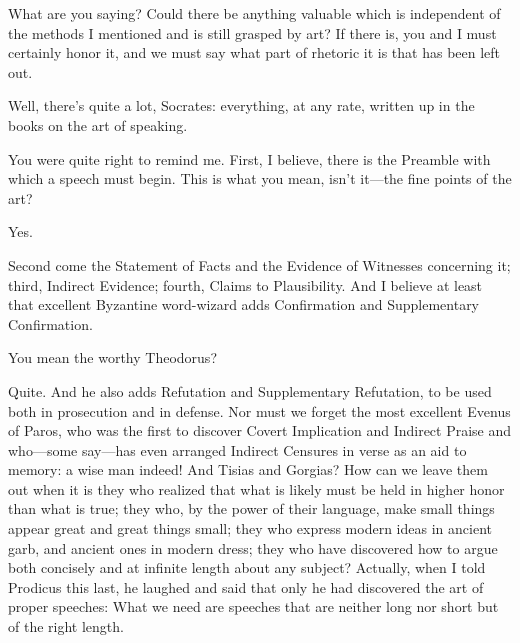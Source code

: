 \saysocrates What are you saying? Could there be anything valuable which 
is independent of the methods I mentioned and is still grasped
by art? If there is, you and I must certainly honor it, and we must say
what part of rhetoric it is that has been left out.

\sayphaedrus Well, there’s quite a lot, Socrates: everything, at any rate,
written up in the books on the art of speaking.

\saysocrates You were quite right to remind me. First, I believe, there is
the Preamble with which a speech must begin. This is what you mean,
isn’t it---the fine points of the art?

\sayphaedrus Yes.

\saysocrates Second come the Statement of Facts and the Evidence of
Witnesses concerning it; third, Indirect Evidence; fourth, Claims to
Plausibility. And I believe at least that excellent Byzantine
word-wizard adds Confirmation and Supplementary Confirmation.

\sayphaedrus You mean the worthy Theodorus?

\saysocrates Quite. And he also adds Refutation and Supplementary
Refutation, to be used both in prosecution and in
defense. Nor must we forget the most excellent Evenus of
Paros, who was the
first to discover Covert Implication and Indirect Praise and who---some
say---has even arranged Indirect Censures in verse as an aid to memory:
a wise man indeed! And
Tisias 
and Gorgias?
How can we leave them out when it is they who realized that what is
likely must be held in higher honor than what is true; they who, by the
power of their language, make small things appear great and great things
small; they who express modern ideas in ancient garb, and
ancient ones in modern dress; they who have discovered how to argue both
concisely and at infinite length about any subject? Actually, when I
told Prodicus this
last, he laughed and said that only he had discovered the art of proper
speeches: What we need are speeches that are neither long nor short but
of the right length.

